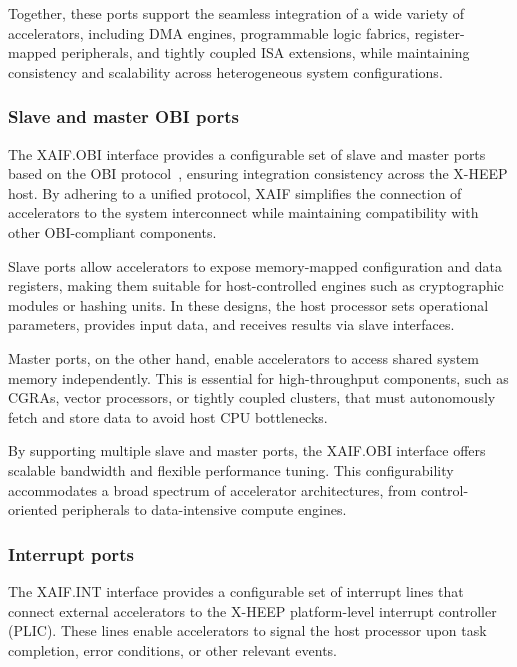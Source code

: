             Together, these ports support the seamless integration of a wide variety of accelerators, including DMA engines, programmable logic fabrics, register-mapped peripherals, and tightly coupled ISA extensions, while maintaining consistency and scalability across heterogeneous system configurations.
        
            \subsubsection*{Slave and master OBI ports}
                
                The XAIF.OBI interface provides a configurable set of slave and master ports based on the OBI protocol~\cite{obi}, ensuring integration consistency across the \mbox{X-HEEP} host. By adhering to a unified protocol, XAIF simplifies the connection of accelerators to the system interconnect while maintaining compatibility with other OBI-compliant components.
                
                Slave ports allow accelerators to expose memory-mapped configuration and data registers, making them suitable for host-controlled engines such as cryptographic modules or hashing units. In these designs, the host processor sets operational parameters, provides input data, and receives results via slave interfaces.
                
                Master ports, on the other hand, enable accelerators to access shared system memory independently. This is essential for high-throughput components, such as CGRAs, vector processors, or tightly coupled clusters, that must autonomously fetch and store data to avoid host CPU bottlenecks.
                
                By supporting multiple slave and master ports, the XAIF.OBI interface offers scalable bandwidth and flexible performance tuning. This configurability accommodates a broad spectrum of accelerator architectures, from control-oriented peripherals to data-intensive compute engines.

            \subsubsection*{Interrupt ports}
                
                The XAIF.INT interface provides a configurable set of interrupt lines that connect external accelerators to the \mbox{X-HEEP} platform-level interrupt controller (PLIC). These lines enable accelerators to signal the host processor upon task completion, error conditions, or other relevant events.
                
